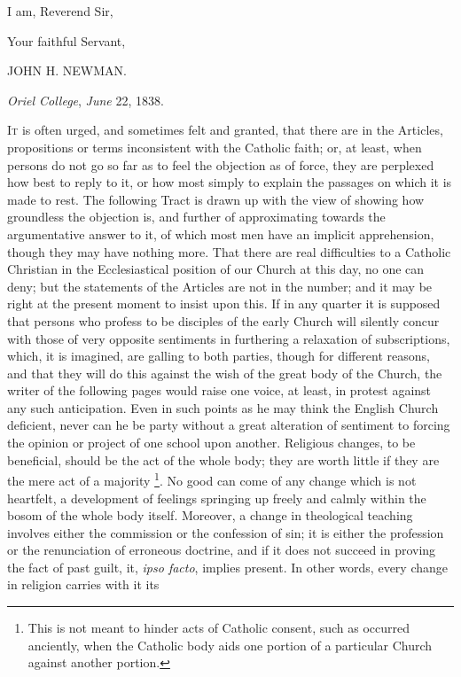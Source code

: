 I am, Reverend Sir,

Your faithful Servant,

JOHN H. NEWMAN.

\emph{Oriel College}, \emph{June} 22, 1838.


I\textsc{t} is often urged, and sometimes felt and granted, that there
are in the Articles, propositions or terms inconsistent with the
Catholic faith; or, at least, when persons do not go so far as to feel
the objection as of force, they are perplexed how best to reply to it,
or how most simply to explain the passages on which it is made to
rest. The following Tract is drawn up with the view of showing how
groundless the objection is, and further of approximating towards the
argumentative answer to it, of which most men have an implicit
apprehension, though they may have nothing more. That there are real
difficulties to a Catholic Christian in the Ecclesiastical position of
our Church at this day, no one can deny; but the statements of the
Articles are not in the number; and it may be right at the present
moment to insist upon this. If in any quarter it is supposed that
persons who profess to be disciples of the early Church will silently
concur with those of very opposite sentiments in furthering a
relaxation of subscriptions, which, it is imagined, are galling to
both parties, though for different reasons, and that they will do this
against the wish of the great body of the Church, the writer of the
following pages would raise one voice, at least, in protest against
any such anticipation. Even in such points as he may think the English
Church deficient, never can he be party without a great alteration of
sentiment to forcing the opinion or project of one school upon
another. Religious changes, to be beneficial, should be the act of the
whole body; they are worth little if they are the mere act of a
majority \footnote{This is not meant to hinder acts of Catholic consent, such as
occurred anciently, when the Catholic body aids one portion of a
particular Church against another portion.}. No good can
come of any change which is not heartfelt, a development of feelings
springing up freely and calmly within the bosom of the whole body
itself. Moreover, a change in theological teaching involves either the
commission or the confession of sin; it is either the profession or
the renunciation of erroneous doctrine, and if it does not succeed in
proving the fact of past guilt, it, \emph{ipso facto}, implies
present. In other words, every change in religion carries with it its
